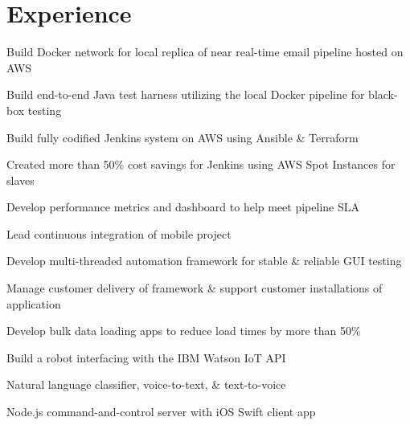 \documentclass[]{resume}
\begin{document}
\hfill
\begin{minipage}[t]{0.60\textwidth} 


\section{Experience}

\newline
\begin{tightemize}
\item Build Docker network for local replica of near real-time email pipeline hosted on AWS
\item Build end-to-end Java test harness utilizing the local Docker pipeline for black-box testing
\item Build fully codified Jenkins system on AWS using Ansible \& Terraform
\item Created more than 50\% cost savings for Jenkins using AWS Spot Instances for slaves 
\item Develop performance metrics and dashboard to help meet pipeline SLA
\end{tightemize}
\sectionsep 

\begin{tightemize}
\item Lead continuous integration of mobile project
\item Develop multi-threaded automation framework for stable \& reliable GUI testing
\item Manage customer delivery of framework \& support customer installations of application
\item Develop bulk data loading apps to reduce load times by more than 50\%
\item Build a robot interfacing with the IBM Watson IoT API\smallbreak
\begin{tightemize}
\item Natural language classifier, voice-to-text, \& text-to-voice
\item Node.js command-and-control server with iOS Swift client app
\end{tightemize}
\end{tightemize}
\sectionsep


\end{minipage}
\end{document}
